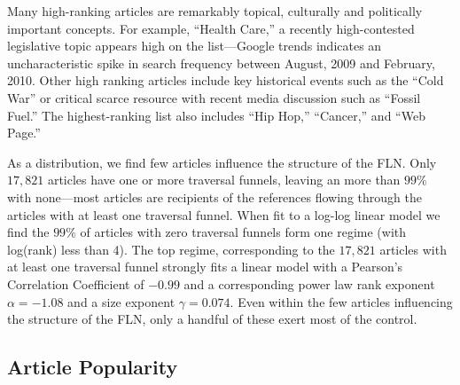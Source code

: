 \documentclass[pre,twocolumn,twoside,superscriptaddress,floatfix, aps, 10pt]{revtex4-1}
\begin{document}
Many high-ranking articles are remarkably topical, culturally and politically important concepts.  For example, ``Health Care,'' a recently high-contested legislative topic appears high on the list---Google trends indicates an uncharacteristic spike in search frequency between August, 2009 and February, 2010.
Other high ranking articles include key historical events such as the ``Cold War'' or critical scarce resource with recent 
media discussion such as ``Fossil Fuel.'' 
The highest-ranking list also includes ``Hip Hop,'' ``Cancer,'' and ``Web Page.''

As a distribution, we find few articles influence the structure of the 
FLN. Only $17, 821$ articles have one or more traversal funnels, leaving
an more than $99\%$ with none---most articles are recipients of 
the references flowing through the articles with at least one traversal funnel.
When fit to a log-log linear model we find the $99\%$ of articles with zero
traversal funnels form one regime (with log(rank) less than 4).
The top regime, corresponding to the $17, 821$ articles with at least one 
traversal funnel strongly fits a linear model with
a Pearson's Correlation Coefficient of $-0.99$ and a 
corresponding power law rank exponent $\alpha = -1.08$
and a size exponent $\gamma = 0.074$. Even within the few articles
influencing the structure of the FLN, only a handful of these exert most of the 
control. 

\subsection{Article Popularity}
\end{document}
